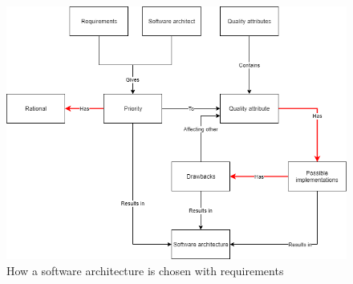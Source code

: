 \begin{figure}[H]
	\includegraphics[width=\linewidth]{creating_architecture_requirements.png}
	\caption{How a software architecture is chosen with requirements}
\end{figure}

